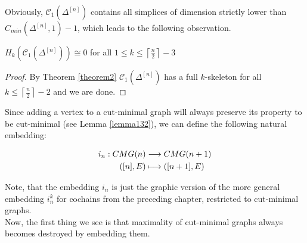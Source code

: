 Obviously, \(\mathcal{C}_1(\Delta^{[n]})\) contains all simplices of dimension strictly lower than\\
\(C_{min}(\Delta^{[n]},1)-1\), which leads to the following observation.

\begin{cor}
\(H_k(\mathcal{C}_1(\Delta^{[n]}))\cong 0\) for all \(1\leq k\leq\left\lceil\frac{n}{2}\right\rceil-3\)
\begin{proof}
By Theorem \ref{theorem2} \(\mathcal{C}_1(\Delta^{[n]})\) has a full \(k\)-skeleton for all \(k\leq\left\lceil\frac{n}{2}\right\rceil-2\) and we are done. 
\end{proof}
\end{cor}

Since adding a vertex to a cut-minimal graph will always preserve its property to be cut-minimal (see Lemma \ref{lemma132}), we can define the following natural embedding:

\begin{align}
i_n:CMG(n)&\longrightarrow CMG(n+1)\notag \\
([n],E)&\longmapsto ([n+1],E)\notag
\end{align}

Note, that the embedding \(i_n\) is just the graphic version of the more general embedding \(i_n^k\) for cochains from the preceding chapter, restricted to cut-minimal graphs.\\
Now, the first thing we see is that maximality of cut-minimal graphs always becomes destroyed by embedding them.

